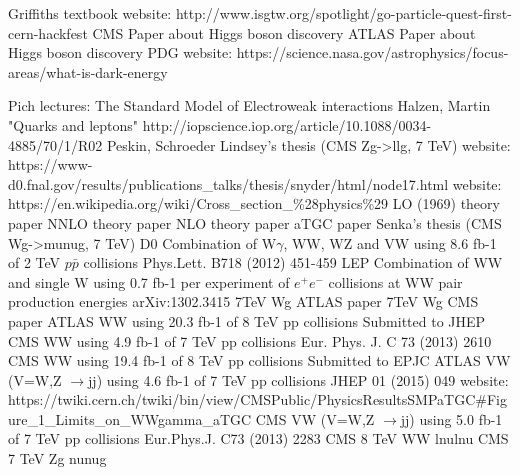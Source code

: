 \begin{thebibliography}{1}


 Griffiths textbook
 website: http://www.isgtw.org/spotlight/go-particle-quest-first-cern-hackfest
 CMS Paper about Higgs boson discovery
 ATLAS Paper about Higgs boson discovery
 PDG
 website: https://science.nasa.gov/astrophysics/focus-areas/what-is-dark-energy


 Pich lectures: The Standard Model of Electroweak interactions
 Halzen, Martin "Quarks and leptons"
 http://iopscience.iop.org/article/10.1088/0034-4885/70/1/R02
 Peskin, Schroeder
 Lindsey's thesis (CMS Zg->llg, 7 TeV)
 website: https://www-d0.fnal.gov/results/publications\_talks/thesis/snyder/html/node17.html
 website: https://en.wikipedia.org/wiki/Cross\_section\_\%28physics\%29
 LO (1969) theory paper
 NNLO theory paper
 NLO theory paper
 aTGC paper
 Senka's thesis (CMS Wg->munug, 7 TeV)
 D0 Combination of W$\gamma$, WW, WZ and VW using 8.6 fb-1 of 2 TeV $p\bar{p}$ collisions Phys.Lett. B718 (2012) 451-459 
 LEP Combination of WW and single W using 0.7 fb-1 per experiment of $e^+e^-$ collisions at WW pair production energies arXiv:1302.3415
 7TeV Wg ATLAS paper
 7TeV Wg CMS paper
 ATLAS WW using 20.3 fb-1 of 8 TeV pp collisions Submitted to JHEP
 CMS WW using 4.9 fb-1 of 7 TeV pp collisions Eur. Phys. J. C 73 (2013) 2610
 CMS WW using 19.4 fb-1 of 8 TeV pp collisions Submitted to EPJC
 ATLAS VW (V=W,Z $\rightarrow$jj) using 4.6 fb-1 of 7 TeV pp collisions JHEP 01 (2015) 049
 website: https://twiki.cern.ch/twiki/bin/view/CMSPublic/PhysicsResultsSMPaTGC\#Figure\_1\_Limits\_on\_WWgamma\_aTGC
 CMS VW (V=W,Z $\rightarrow$jj) using 5.0 fb-1 of 7 TeV pp collisions Eur.Phys.J. C73 (2013) 2283
 CMS 8 TeV WW lnulnu
 CMS 7 TeV Zg nunug



\end{thebibliography}

